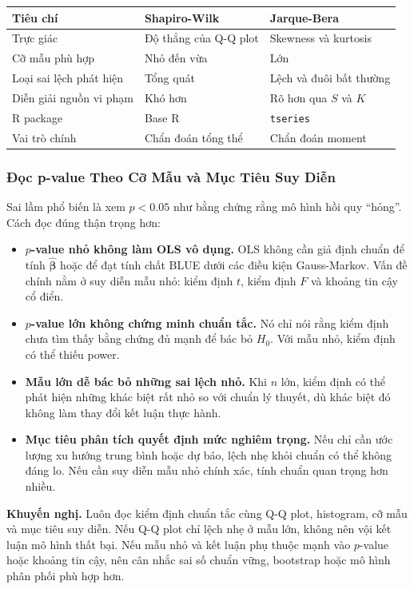 \begin{center}
\begin{tabular}{@{}lll@{}}
\toprule
\textbf{Tiêu chí} & \textbf{Shapiro-Wilk} & \textbf{Jarque-Bera} \\
\midrule
Trực giác & Độ thẳng của Q-Q plot & Skewness và kurtosis \\
Cỡ mẫu phù hợp & Nhỏ đến vừa & Lớn \\
Loại sai lệch phát hiện & Tổng quát & Lệch và đuôi bất thường \\
Diễn giải nguồn vi phạm & Khó hơn & Rõ hơn qua $S$ và $K$ \\
R package & Base R & \texttt{tseries} \\
Vai trò chính & Chẩn đoán tổng thể & Chẩn đoán moment \\
\bottomrule
\end{tabular}
\end{center}

\subsubsection{Đọc p-value Theo Cỡ Mẫu và Mục Tiêu Suy Diễn}

Sai lầm phổ biến là xem $p < 0.05$ như bằng chứng rằng mô hình hồi quy ``hỏng''. Cách đọc đúng thận trọng hơn:
\begin{itemize}
  \item \textbf{$p$-value nhỏ không làm OLS vô dụng.} OLS không cần giả định chuẩn để tính $\hat{\boldsymbol{\beta}}$ hoặc để đạt tính chất BLUE dưới các điều kiện Gauss-Markov. Vấn đề chính nằm ở suy diễn mẫu nhỏ: kiểm định $t$, kiểm định $F$ và khoảng tin cậy cổ điển.
  \item \textbf{$p$-value lớn không chứng minh chuẩn tắc.} Nó chỉ nói rằng kiểm định chưa tìm thấy bằng chứng đủ mạnh để bác bỏ $H_0$. Với mẫu nhỏ, kiểm định có thể thiếu power.
  \item \textbf{Mẫu lớn dễ bác bỏ những sai lệch nhỏ.} Khi $n$ lớn, kiểm định có thể phát hiện những khác biệt rất nhỏ so với chuẩn lý thuyết, dù khác biệt đó không làm thay đổi kết luận thực hành.
  \item \textbf{Mục tiêu phân tích quyết định mức nghiêm trọng.} Nếu chỉ cần ước lượng xu hướng trung bình hoặc dự báo, lệch nhẹ khỏi chuẩn có thể không đáng lo. Nếu cần suy diễn mẫu nhỏ chính xác, tính chuẩn quan trọng hơn nhiều.
\end{itemize}

\begin{notebox}
\textbf{Khuyến nghị.} Luôn đọc kiểm định chuẩn tắc cùng Q-Q plot, histogram, cỡ mẫu và mục tiêu suy diễn. Nếu Q-Q plot chỉ lệch nhẹ ở mẫu lớn, không nên vội kết luận mô hình thất bại. Nếu mẫu nhỏ và kết luận phụ thuộc mạnh vào $p$-value hoặc khoảng tin cậy, nên cân nhắc sai số chuẩn vững, bootstrap hoặc mô hình phân phối phù hợp hơn.
\end{notebox}

